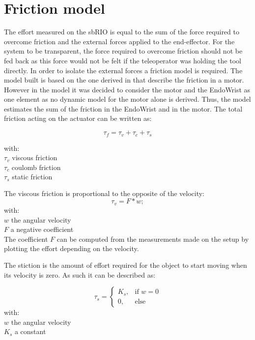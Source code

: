 \section{Friction model}

The effort measured on the sbRIO is equal to the sum of the force required to overcome friction and the external forces applied to the end-effector. For the system to be transparent, the force required to overcome friction should not be fed back as this force would not be felt if the teleoperator was holding the tool directly. In order to isolate the external forces a friction model is required. The model built is based on the one derived in \cite{force_reflection} that describe the friction in a motor. However in the model it was decided to consider the motor and the EndoWrist as one element as no dynamic model for the motor alone is derived. Thus, the model estimates the sum of the friction in the EndoWrist and in the motor.
The total friction acting on the actuator can be written as:

\begin{equation}
\tau_f = \tau_v + \tau_c + \tau_s
\label{eq:total_friction}
\end{equation} 

with:\\
\hspace*{8mm} $\tau_v$ viscous friction\\
\hspace*{8mm} $\tau_c$ coulomb friction\\
\hspace*{8mm} $\tau_s$ static friction    


The viscous friction is proportional to the opposite of the velocity:
\begin{equation}
\tau_v = F * w;
\label{eq:viscous_friction}
\end{equation}
with:\\
\hspace*{8mm}$w$ the angular velocity\\
\hspace*{8mm}$F$ a negative coefficient\\

The coefficient $F$ can be computed from the measurements made on the setup by plotting the effort depending on the velocity.

The stiction is the amount of effort required for the object to start moving when its velocity is zero. As such it can be described as:

\begin{equation} 
\tau_s =  \begin{cases} K_s, & \mbox{if } w = 0 \\ 0, & \mbox{else} \end{cases}
\label{eq:static_friction}
\end{equation}
with:\\
\hspace*{8mm}$w$ the angular velocity\\
\hspace*{8mm}$K_s$ a constant\\

